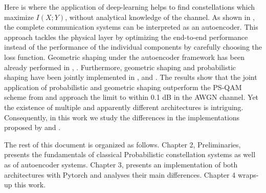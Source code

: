 Here is where the application of deep-learning helps to find constellations which maximize $I(X;Y)$, without analytical knowledge of the channel. As shown in \cite{O'Shea}, the complete communication systems can be interpreted as an autoencoder. This approach tackles the physical layer by optimizing the end-to-end performance instead of the performance of the individual components by carefully choosing the loss function. Geometric shaping under the autoencoder framework has been already performed in \cite{O'Shea}, \cite{Jones}. Furthermore, geometric shaping and probabilistic shaping have been jointly implemented in \cite{Stark}, \cite{Aoudia} and \cite{Aref}. The results show that the joint application of probabilistic and geometric shaping outperform the PS-QAM scheme from \cite{Boecherer} and approach the limit to within 0.1 dB in the AWGN channel. Yet the existence of multiple and apparently different architectures is intriguing. Consequently, in this work we study the differences in the implementations proposed by \cite{Stark} and \cite{Aref}.

The rest of this document is organized as follows. Chapter 2, Preliminaries, presents the fundamentals of classical Probabilistic constellation systems as well as of autoencoder systems. Chapter 3, presents an implementation of both architectures with Pytorch \cite{PyTorch} and analyses their main differences. Chapter 4 wraps-up this work.
